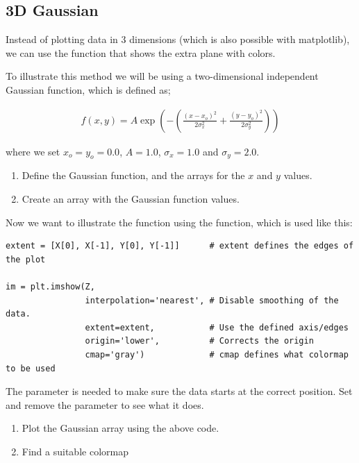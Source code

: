 \documentclass{article}
\begin{document}
\fi
\newpage
\subsection{3D Gaussian}

Instead of plotting data in 3 dimensions (which is also possible with matplotlib), we can use the  function that shows the extra plane with colors.

To illustrate this method we will be using a two-dimensional independent Gaussian function, which is defined as;

\begin{align}
  f(x,y) = A \exp \left ( - \left ( \frac{(x - x_o)^2}{2\sigma_x^2} + \frac{(y - y_o)^2}{2\sigma_y^2} \right ) \right )
\end{align}

where we set $x_o = y_o = 0.0$, $A = 1.0$, $\sigma_x = 1.0$ and $\sigma_y = 2.0$.\\


\begin{enumerate}

    \item Define the Gaussian function, and the arrays for the $x$ and $y$ values.

    \item Create an array  with the Gaussian function values.

\end{enumerate}

Now we want to illustrate the function using the  function, which is used like this:

\begin{lstlisting}
extent = [X[0], X[-1], Y[0], Y[-1]]      # extent defines the edges of the plot

im = plt.imshow(Z,
                interpolation='nearest', # Disable smoothing of the data.
                extent=extent,           # Use the defined axis/edges
                origin='lower',          # Corrects the origin
                cmap='gray')             # cmap defines what colormap to be used
\end{lstlisting}

The  parameter is needed to make sure the data starts at the correct position.
Set  and remove the parameter to see what it does.

\begin{enumerate}[resume]

    \item Plot the Gaussian array using the above code.

    \item Find a suitable colormap

\end{enumerate}
\end{document}
